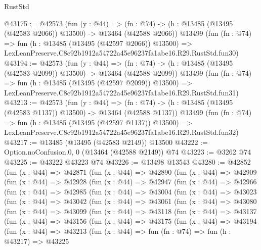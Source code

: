 \begin{lexlean}{RustStd}
\begin{coremodule}
@43175 := @42573
    (fun (y : @44) =>
    (fn : @74) -> (h : @13485 (@13495 (@42583 @2066)) @13500) -> @13464 (@42588 @2066))
    @13499
    (fun (fn : @74) =>
    fun (h : @13485 (@13495 (@42597 @2066)) @13500) =>
    LexLeanPreserve.C8c92b1912a54722a45e96237fa1abe16.R29.RustStd.fun30)
@43194 := @42573
    (fun (y : @44) =>
    (fn : @74) -> (h : @13485 (@13495 (@42583 @2099)) @13500) -> @13464 (@42588 @2099))
    @13499
    (fun (fn : @74) =>
    fun (h : @13485 (@13495 (@42597 @2099)) @13500) =>
    LexLeanPreserve.C8c92b1912a54722a45e96237fa1abe16.R29.RustStd.fun31)
@43213 := @42573
    (fun (y : @44) =>
    (fn : @74) -> (h : @13485 (@13495 (@42583 @1137)) @13500) -> @13464 (@42588 @1137))
    @13499
    (fun (fn : @74) =>
    fun (h : @13485 (@13495 (@42597 @1137)) @13500) =>
    LexLeanPreserve.C8c92b1912a54722a45e96237fa1abe16.R29.RustStd.fun32)
@43217 := @13485 (@13495 (@42583 @2149)) @13500
@43222 := Option.noConfusion.{0, 0} (@13464 (@42588 @2149)) @74
@43223 := @3262 @74
@43225 := @43222 @43223 @74
@43226 := @13498 @13543
@43280 := @42852
    (fun (x : @44) =>
    @42871
      (fun (x : @44) =>
      @42890
        (fun (x : @44) =>
        @42909
          (fun (x : @44) =>
          @42928
            (fun (x : @44) =>
            @42947
              (fun (x : @44) =>
              @42966
                (fun (x : @44) =>
                @42985
                  (fun (x : @44) =>
                  @43004
                    (fun (x : @44) =>
                    @43023
                      (fun (x : @44) =>
                      @43042
                        (fun (x : @44) =>
                        @43061
                          (fun (x : @44) =>
                          @43080
                            (fun (x : @44) =>
                            @43099
                              (fun (x : @44) =>
                              @43118
                                (fun (x : @44) =>
                                @43137
                                  (fun (x : @44) =>
                                  @43156
                                    (fun (x : @44) =>
                                    @43175
                                      (fun (x : @44) =>
                                      @43194
                                        (fun (x : @44) =>
                                        @43213
                                          (fun (x : @44) =>
                                          fun (fn : @74) =>
                                          fun (h : @43217) =>
                                          @43225

\end{coremodule}
\end{lexlean}
